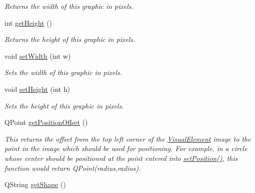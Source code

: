 \begin{DoxyCompactItemize}
\begin{DoxyCompactList}\small\item\em Returns the width of this graphic in pixels. \end{DoxyCompactList}\item 
\hypertarget{class_picto_1_1_shape_shifter_graphic_aeb566ce5753f26c55bc83ebafa82eabc}{int \hyperlink{class_picto_1_1_shape_shifter_graphic_aeb566ce5753f26c55bc83ebafa82eabc}{get\-Height} ()}\label{class_picto_1_1_shape_shifter_graphic_aeb566ce5753f26c55bc83ebafa82eabc}

\begin{DoxyCompactList}\small\item\em Returns the height of this graphic in pixels. \end{DoxyCompactList}\item 
\hypertarget{class_picto_1_1_shape_shifter_graphic_ab24eff84a77f7f407dcda3d9fddf06e2}{void \hyperlink{class_picto_1_1_shape_shifter_graphic_ab24eff84a77f7f407dcda3d9fddf06e2}{set\-Width} (int w)}\label{class_picto_1_1_shape_shifter_graphic_ab24eff84a77f7f407dcda3d9fddf06e2}

\begin{DoxyCompactList}\small\item\em Sets the width of this graphic in pixels. \end{DoxyCompactList}\item 
\hypertarget{class_picto_1_1_shape_shifter_graphic_ae03de550106a223a04413008a1f07464}{void \hyperlink{class_picto_1_1_shape_shifter_graphic_ae03de550106a223a04413008a1f07464}{set\-Height} (int h)}\label{class_picto_1_1_shape_shifter_graphic_ae03de550106a223a04413008a1f07464}

\begin{DoxyCompactList}\small\item\em Sets the height of this graphic in pixels. \end{DoxyCompactList}\item 
\hypertarget{class_picto_1_1_shape_shifter_graphic_a2031443815ea02c9e75fbe9b898f24e0}{Q\-Point \hyperlink{class_picto_1_1_shape_shifter_graphic_a2031443815ea02c9e75fbe9b898f24e0}{get\-Position\-Offset} ()}\label{class_picto_1_1_shape_shifter_graphic_a2031443815ea02c9e75fbe9b898f24e0}

\begin{DoxyCompactList}\small\item\em This returns the offset from the top left corner of the \hyperlink{struct_picto_1_1_visual_element}{Visual\-Element} image to the point in the image which should be used for positioning. For example, in a circle whose center should be positioned at the point entered into \hyperlink{struct_picto_1_1_visual_element_a454cc96862097e96a0b0f1d2c83e23ed}{set\-Position()}, this function would return Q\-Point(radius,radius). \end{DoxyCompactList}\item 
\hypertarget{class_picto_1_1_shape_shifter_graphic_aac3794880ea796ee23fb65d76f5cc746}{Q\-String \hyperlink{class_picto_1_1_shape_shifter_graphic_aac3794880ea796ee23fb65d76f5cc746}{get\-Shape} ()}\label{class_picto_1_1_shape_shifter_graphic_aac3794880ea796ee23fb65d76f5cc746}


\end{DoxyCompactItemize}
